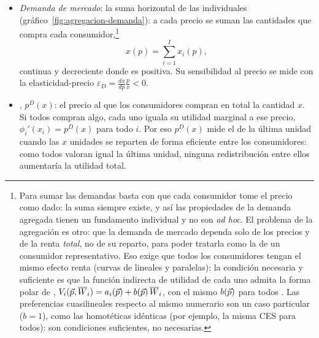 \documentclass[11pt]{article}
\begin{document}
\begin{itemize}
\begin{itemize}
  \item La condición no depende de la renta: la  (ordinaria o walrasiana) $x_i(p)=(\phi_i')^{-1}(p)$ solo depende del precio, a diferencia de la demanda marshalliana general, que depende de la renta . Sin efecto renta, coincide con la hicksiana .\footnote{Con varios bienes no numerarios y utilidad cuasilineal, como en muchos modelos de diferenciación de productos, la demanda de cada uno depende de todos sus precios, pero sigue sin efecto renta .}
  \item Como $\phi_i'$ es decreciente, la demanda es decreciente en el precio, y la curva de demanda inversa del consumidor es su curva de utilidad marginal.
  \end{itemize}
\item \emph{Demanda de mercado}: la suma horizontal de las individuales (gráfico~\ref{fig:agregacion-demanda}): a cada precio se suman las cantidades que compra cada consumidor,\footnote{Para sumar las demandas basta con que cada consumidor tome el precio como dado: la suma siempre existe, y así las propiedades de la demanda agregada tienen un fundamento individual y no son \emph{ad hoc}. El problema de la agregación es otro: que la demanda de mercado dependa solo de los precios y de la renta \emph{total}, no de su reparto, para poder tratarla como la de un consumidor representativo. Eso exige que todos los consumidores tengan el mismo efecto renta (curvas de  lineales y paralelas): la condición necesaria y suficiente es que la función indirecta de utilidad de cada uno admita la forma polar de , $V_i(\vec{p},\overline{W}_i)=a_i(\vec{p})+b(\vec{p})\,\overline{W}_i$, con el mismo $b(\vec{p})$ para todos\nocite{Gorman1953Community,Gorman1961Class} . Las preferencias cuasilineales respecto al mismo numerario son un caso particular ($b=1$), como las homotéticas idénticas (por ejemplo, la misma CES para todos): son condiciones suficientes, no necesarias.}
  \begin{equation}
  x(p)=\sum_{i=1}^{I}x_i(p), \label{eq:demanda-mercado}
  \end{equation}
  continua y decreciente donde es positiva. Su sensibilidad al precio se mide con la elasticidad-precio $\varepsilon_D=\frac{dx}{dp}\frac{p}{x}<0$.
\item {}, $p^D(x)$: el precio al que los consumidores compran en total la cantidad $x$. Si todos compran algo, cada uno iguala su utilidad marginal a ese precio, $\phi_i'(x_i)=p^D(x)$ para todo $i$. Por eso $p^D(x)$ mide el  de la última unidad cuando las $x$ unidades se reparten de forma eficiente entre los consumidores: como todos valoran igual la última unidad, ninguna redistribución entre ellos aumentaría la utilidad total.
\end{itemize}
\end{document}
